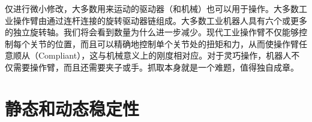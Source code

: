 仅进行微小修改，大多数用来运动的驱动器（和机械）也可以用于操作。大多数工业操作臂由通过连杆连接的旋转驱动器链组成。大多数工业机器人具有六个或更多的独立旋转轴。我们将会看到数量为什么进一步减少。现代工业操作臂不仅能够控制每个关节的位置，而且可以精确地控制单个关节处的扭矩和力，从而使操作臂任意顺从（Compliant），这与机械意义上的刚度相对应。对于灵巧操作，机器人不仅需要操作臂，而且还需要夹子或手。抓取本身就是一个难题，值得独自成章。


\section{静态和动态稳定性}\label{sec:stability}


